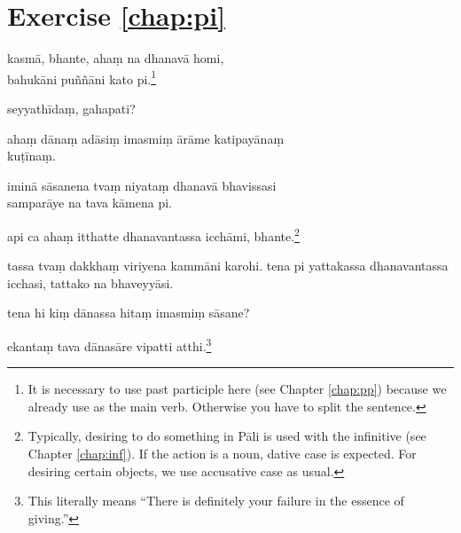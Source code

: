 \section*{Exercise \ref{chap:pi}}
\begin{answerkey}
\item kasm\=a, bhante, aha\d m na dhanav\=a homi, \\bahuk\=ani pu\~n\~n\=ani kato pi.\footnote{It is necessary to use past participle here (see Chapter \ref{chap:pp}) because we already use  as the main verb. Otherwise you have to split the sentence.}
\item seyyath\=ida\d m, gahapati?
\item aha\d m d\=ana\d m ad\=asi\d m imasmi\d m \=ar\=ame katipay\=ana\d m \\ku\d t\=ina\d m.
\item imin\=a s\=asanena tva\d m niyata\d m dhanav\=a bhavissasi \\sampar\=aye na tava k\=amena pi.
\item api ca aha\d m itthatte dhanavantassa icch\=ami, bhante.\footnote{Typically, desiring to do something in P\=ali  is used with the infinitive (see Chapter \ref{chap:inf}). If the action is a noun, dative case is expected. For desiring certain objects, we use accusative case as usual.}
\item tassa tva\d m dakkha\d m viriyena kamm\=ani karohi. tena pi yattakassa dhanavantassa icchasi, tattako na bhaveyy\=asi.
\item tena hi ki\d m d\=anassa hita\d m imasmi\d m s\=asane?
\item ekanta\d m tava d\=anas\=are vipatti atthi.\footnote{This literally means ``There is definitely your failure in the essence of giving.''}
\end{answerkey}

